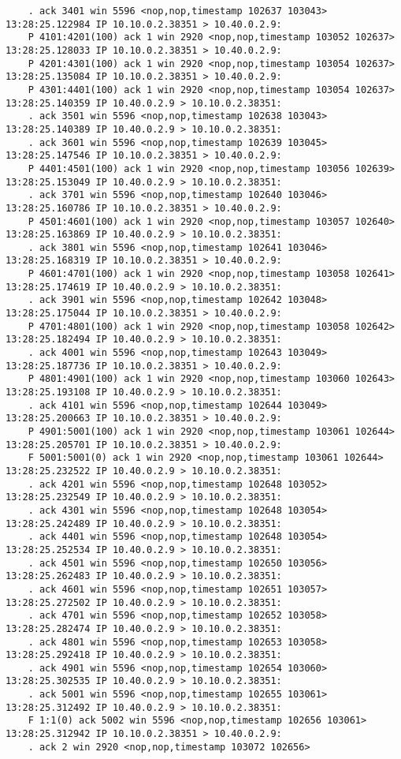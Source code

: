 \documentclass[a4paper,12pt]{article}
\begin{document}
\begin{Verbatim}
    . ack 3401 win 5596 <nop,nop,timestamp 102637 103043>
13:28:25.122984 IP 10.10.0.2.38351 > 10.40.0.2.9: 
    P 4101:4201(100) ack 1 win 2920 <nop,nop,timestamp 103052 102637>
13:28:25.128033 IP 10.10.0.2.38351 > 10.40.0.2.9: 
    P 4201:4301(100) ack 1 win 2920 <nop,nop,timestamp 103054 102637>
13:28:25.135084 IP 10.10.0.2.38351 > 10.40.0.2.9: 
    P 4301:4401(100) ack 1 win 2920 <nop,nop,timestamp 103054 102637>
13:28:25.140359 IP 10.40.0.2.9 > 10.10.0.2.38351: 
    . ack 3501 win 5596 <nop,nop,timestamp 102638 103043>
13:28:25.140389 IP 10.40.0.2.9 > 10.10.0.2.38351: 
    . ack 3601 win 5596 <nop,nop,timestamp 102639 103045>
13:28:25.147546 IP 10.10.0.2.38351 > 10.40.0.2.9: 
    P 4401:4501(100) ack 1 win 2920 <nop,nop,timestamp 103056 102639>
13:28:25.153049 IP 10.40.0.2.9 > 10.10.0.2.38351: 
    . ack 3701 win 5596 <nop,nop,timestamp 102640 103046>
13:28:25.160786 IP 10.10.0.2.38351 > 10.40.0.2.9: 
    P 4501:4601(100) ack 1 win 2920 <nop,nop,timestamp 103057 102640>
13:28:25.163869 IP 10.40.0.2.9 > 10.10.0.2.38351: 
    . ack 3801 win 5596 <nop,nop,timestamp 102641 103046>
13:28:25.168319 IP 10.10.0.2.38351 > 10.40.0.2.9: 
    P 4601:4701(100) ack 1 win 2920 <nop,nop,timestamp 103058 102641>
13:28:25.174619 IP 10.40.0.2.9 > 10.10.0.2.38351: 
    . ack 3901 win 5596 <nop,nop,timestamp 102642 103048>
13:28:25.175044 IP 10.10.0.2.38351 > 10.40.0.2.9: 
    P 4701:4801(100) ack 1 win 2920 <nop,nop,timestamp 103058 102642>
13:28:25.182494 IP 10.40.0.2.9 > 10.10.0.2.38351: 
    . ack 4001 win 5596 <nop,nop,timestamp 102643 103049>
13:28:25.187736 IP 10.10.0.2.38351 > 10.40.0.2.9: 
    P 4801:4901(100) ack 1 win 2920 <nop,nop,timestamp 103060 102643>
13:28:25.193108 IP 10.40.0.2.9 > 10.10.0.2.38351: 
    . ack 4101 win 5596 <nop,nop,timestamp 102644 103049>
13:28:25.200663 IP 10.10.0.2.38351 > 10.40.0.2.9: 
    P 4901:5001(100) ack 1 win 2920 <nop,nop,timestamp 103061 102644>
13:28:25.205701 IP 10.10.0.2.38351 > 10.40.0.2.9: 
    F 5001:5001(0) ack 1 win 2920 <nop,nop,timestamp 103061 102644>
13:28:25.232522 IP 10.40.0.2.9 > 10.10.0.2.38351: 
    . ack 4201 win 5596 <nop,nop,timestamp 102648 103052>
13:28:25.232549 IP 10.40.0.2.9 > 10.10.0.2.38351: 
    . ack 4301 win 5596 <nop,nop,timestamp 102648 103054>
13:28:25.242489 IP 10.40.0.2.9 > 10.10.0.2.38351: 
    . ack 4401 win 5596 <nop,nop,timestamp 102648 103054>
13:28:25.252534 IP 10.40.0.2.9 > 10.10.0.2.38351: 
    . ack 4501 win 5596 <nop,nop,timestamp 102650 103056>
13:28:25.262483 IP 10.40.0.2.9 > 10.10.0.2.38351: 
    . ack 4601 win 5596 <nop,nop,timestamp 102651 103057>
13:28:25.272502 IP 10.40.0.2.9 > 10.10.0.2.38351: 
    . ack 4701 win 5596 <nop,nop,timestamp 102652 103058>
13:28:25.282474 IP 10.40.0.2.9 > 10.10.0.2.38351: 
    . ack 4801 win 5596 <nop,nop,timestamp 102653 103058>
13:28:25.292418 IP 10.40.0.2.9 > 10.10.0.2.38351: 
    . ack 4901 win 5596 <nop,nop,timestamp 102654 103060>
13:28:25.302535 IP 10.40.0.2.9 > 10.10.0.2.38351: 
    . ack 5001 win 5596 <nop,nop,timestamp 102655 103061>
13:28:25.312492 IP 10.40.0.2.9 > 10.10.0.2.38351: 
    F 1:1(0) ack 5002 win 5596 <nop,nop,timestamp 102656 103061>
13:28:25.312942 IP 10.10.0.2.38351 > 10.40.0.2.9: 
    . ack 2 win 2920 <nop,nop,timestamp 103072 102656>
\end{Verbatim}
\end{document}
